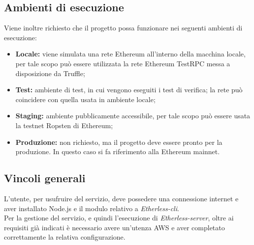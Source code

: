 \subsection{Ambienti di esecuzione}
Viene inoltre richiesto che il progetto possa funzionare nei seguenti ambienti di esecuzione: 
	\begin{itemize}
		\item \textbf{Locale:} viene simulata una rete Ethereum all'interno della macchina locale, per tale scopo può essere utilizzata la rete Ethereum TestRPC messa a disposizione da Truffle; 
		\item \textbf{Test:} ambiente di test, in cui vengono eseguiti i test di verifica; la rete può coincidere con quella usata in ambiente locale; 
		\item \textbf{Staging:} ambiente pubblicamente accessibile, per tale scopo può essere usata la testnet Ropsten di Ethereum;
		\item \textbf{Produzione:} non richiesto, ma il progetto deve essere pronto per la produzione. In questo caso si fa riferimento alla Ethereum mainnet. 
	\end{itemize}

\subsection{Vincoli generali}
L'utente, per usufruire del servizio, deve possedere una connessione internet e aver installato Node.js e il modulo relativo a \textit{Etherless-cli}. \\ 
Per la gestione del servizio, e quindi l'esecuzione di \textit{Etherless-server}, oltre ai requisiti già indicati è necessario avere un'utenza AWS e aver completato correttamente la relativa configurazione. 
